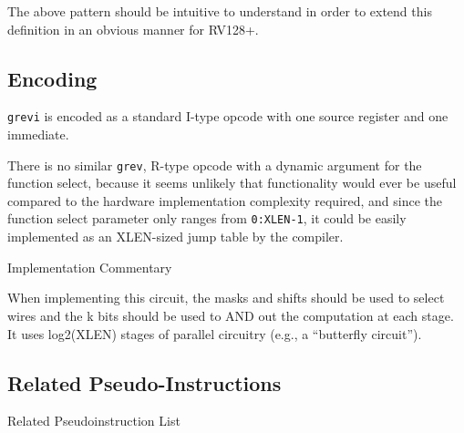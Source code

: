 The above pattern should be intuitive to understand in order to extend
this definition in an obvious manner for RV128+.

\subsection{Encoding}



\texttt{grevi} is encoded as a standard I-type opcode with one source
register and one immediate.

There is no similar \texttt{grev}, R-type opcode with a dynamic argument
for the function select, because it seems unlikely that functionality
would ever be useful compared to the hardware implementation complexity
required, and since the function select parameter only ranges from
\texttt{0:XLEN-1}, it could be easily implemented as an XLEN-sized jump
table by the compiler.

Implementation Commentary

When implementing this circuit, the masks and shifts should be used to
select wires and the k bits should be used to AND out the computation at
each stage. It uses log2(XLEN) stages of parallel circuitry (e.g., a
``butterfly circuit'').

\subsection{Related Pseudo-Instructions}

Related Pseudoinstruction List

